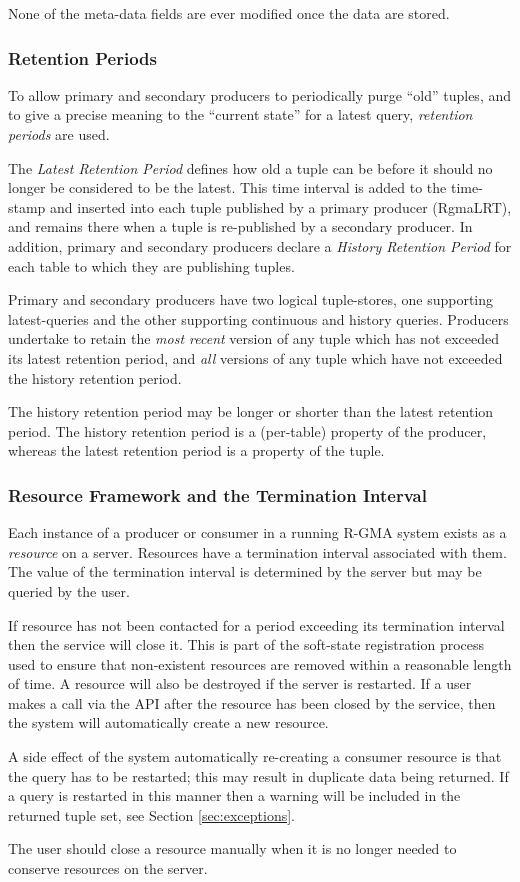 None of the meta-data fields are ever modified once the data are
stored.

\subsubsection{Retention Periods}
\label{sec:rp}
To allow primary and secondary producers to periodically purge ``old''
tuples, and to give a precise meaning to the ``current state'' for a
latest query, \emph{retention periods} are used.

The \emph{Latest Retention Period} defines how old a tuple can be
before it should no longer be considered to be the latest. This time
interval is added to the time-stamp and inserted into each tuple
published by a primary producer (RgmaLRT), and remains there when a
tuple is re-published by a secondary producer. In addition, primary
and secondary producers declare a \emph{History Retention Period} for
each table to which they are publishing tuples.

Primary and secondary producers have two logical tuple-stores, one
supporting latest-queries and the other supporting continuous and
history queries. Producers undertake to retain the \emph{most recent}
version of any tuple which has not exceeded its latest retention
period, and \emph{all} versions of any tuple which have not exceeded
the history retention period.

The history retention period may be longer or shorter than the latest
retention period. The history retention period is a (per-table)
property of the producer, whereas the latest retention period is a
property of the tuple.

\subsubsection{Resource Framework and the Termination Interval}
\label{sec:ti}
Each instance of a producer or consumer in a running R-GMA system
exists as a \emph{resource} on a server. Resources have a termination
interval associated with them. The value of the termination
interval is determined by the server but may be queried by the user.

If resource has not been contacted for a period exceeding its
termination interval then the service will close it. This is part of
the soft-state registration process used to ensure that non-existent
resources are removed within a reasonable length of time. A resource
will also be destroyed if the server is restarted. If a user makes a
call via the API after the resource has been closed by the service,
then the system will automatically create a new resource.

A side effect of the system automatically re-creating a consumer
resource is that the query has to be restarted; this may result in
duplicate data being returned. If a query is restarted in this manner
then a warning will be included in the returned tuple set, see Section
\ref{sec:exceptions}.

The user should close a resource manually when it is no longer needed
to conserve resources on the server.
